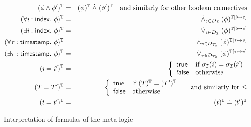 \begin{figure}[t]
  \begin{eqnarray*}
    (\phi\wedge\phi')^{\mathbb{T}} &=& (\phi)^{\mathbb{T}} \stackrel{.}{\wedge} (\phi')^{\mathbb{T}}
    \quad \text{and similarly for other boolean connectives} \\
    (\forall i:\textsf{index}.~ \phi)^{\mathbb{T}} &=&
    \stackrel{.}{\wedge}_{e\in D_{\mathcal{I}}} (\phi)^{\mathbb{T}[i\mapsto e]} \\
    (\exists i:\textsf{index}.~ \phi)^{\mathbb{T}} &=&
    \stackrel{.}{\vee}_{e\in D_{\mathcal{I}}} (\phi)^{\mathbb{T}[i\mapsto e]} \\
    (\forall \tau:\textsf{timestamp}.~ \phi)^{\mathbb{T}} &=&
    \stackrel{.}{\wedge}_{v\in D_{\mathcal{T}_s}} (\phi)^{\mathbb{T}[\tau\mapsto v]} \\
    (\exists \tau:\textsf{timestamp}.~ \phi)^{\mathbb{T}} &=&
    \stackrel{.}{\vee}_{v\in D_{\mathcal{T}_s}} (\phi)^{\mathbb{T}[\tau\mapsto v]} \\
    (i=i')^{\mathbb{T}} &=&
    \left\{\begin{array}{ll}
      \mathsf{true} & \text{if } \sigma_{\mathcal{I}}(i)=\sigma_{\mathcal{I}}(i') \\
      \mathsf{false} & \text{otherwise}
    \end{array}\right. \\
    (T = T')^{\mathbb{T}} &=&
    \left\{\begin{array}{ll}
      \mathsf{true} & \text{if } (T)^{\mathbb{T}} = (T')^{\mathbb{T}} \\
      \mathsf{false} & \text{otherwise}
    \end{array}\right.
    \quad\text{ and similarly for $\leq$} \\
    (t=t')^{\mathbb{T}} &=& (t)^{\mathbb{T}} \stackrel{.}{=} (t')^{\mathbb{T}}
  \end{eqnarray*}
  \caption{Interpretation of %
    formulas of the meta-logic}
  \label{fig:interpf}
\end{figure}

